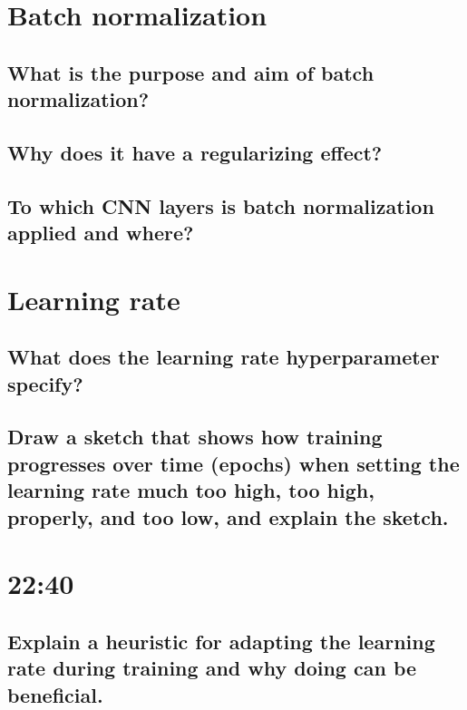 \section{Batch normalization}

\subsection{What is the purpose and aim of batch normalization?}

\subsection{Why does it have a regularizing effect?}

\subsection{To which CNN layers is batch normalization applied and where?}

\section{Learning rate}

\subsection{What does the learning rate hyperparameter specify?}

\subsection{Draw a sketch that shows how training progresses over time (epochs) when setting the learning rate much too high, too high, properly, and too low, and explain the sketch.}

\subsubsection{ }
\section{22:40}

\subsection{Explain a heuristic for adapting the learning rate during training and why doing can be beneficial.}

